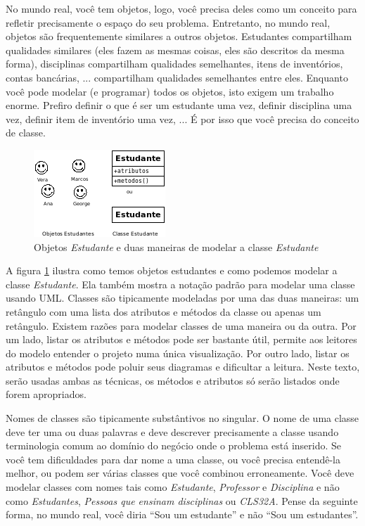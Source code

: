 \documentclass[
	article,			%
	12pt,				%
	openright,
	twoside,			%
	a4paper,			%
	english,			%
	french,
	brazil,				%
	sumario=tradicional
	]{abntex2}
\begin{document}
No mundo real, você tem objetos, logo, você precisa deles como um conceito para refletir precisamente o espaço do seu problema. Entretanto, no mundo real, objetos são frequentemente similares a outros objetos. Estudantes compartilham qualidades similares (eles fazem as mesmas coisas, eles são descritos da mesma forma), disciplinas compartilham qualidades semelhantes, itens de  inventórios, contas bancárias, ... compartilham qualidades semelhantes entre eles. Enquanto você pode modelar (e programar) todos os objetos, isto exigem um trabalho enorme. Prefiro definir o que é ser um estudante uma vez, definir disciplina uma vez, definir item de inventório uma vez, ... É por isso que você precisa do conceito de classe.

\begin{figure}[h]
\begin{center}
\includegraphics[scale=1]{objClassStdt.png} 
\caption[Objetos e Classe \emph{Estudante}]{Objetos \emph{Estudante} e duas maneiras de modelar a classe \emph{Estudante}} \label{fig:objStdt}
\end{center}
\end{figure}

A figura \ref{fig:objStdt} ilustra como temos objetos estudantes e como podemos modelar a classe \emph{Estudante}. Ela também mostra a notação padrão para modelar uma classe usando UML. Classes são tipicamente modeladas por uma das duas maneiras: um retângulo com uma lista dos atributos e métodos da classe ou apenas um retângulo. Existem razões para modelar classes de uma maneira ou da outra. Por um lado, listar os atributos e métodos pode ser bastante útil, permite aos leitores do modelo entender o projeto numa única visualização. Por outro lado, listar os atributos e métodos pode poluir seus diagramas e dificultar a leitura. Neste texto, serão usadas ambas as técnicas, os métodos e atributos só serão listados onde forem apropriados.

Nomes de classes são tipicamente substântivos no singular. O nome de uma classe deve ter uma ou duas palavras e deve descrever precisamente a classe usando terminologia comum ao domínio do negócio onde o problema está inserido. Se você tem dificuldades para dar nome a uma classe, ou você precisa entendê-la melhor, ou podem ser várias classes que você combinou erroneamente. Você deve modelar classes com nomes tais como \emph{Estudante}, \emph{Professor} e \emph{Disciplina} e não como \textit{Estudantes}, \textit{Pessoas que ensinam disciplinas} ou \textit{CLS32A}. Pense da seguinte forma, no mundo real, você diria ``Sou um estudante'' e não ``Sou um estudantes''.
\end{document}
